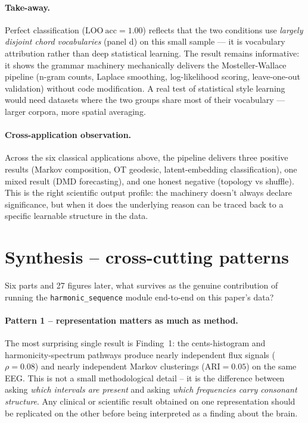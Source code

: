 \documentclass[11pt,a4paper]{article}
\begin{document}
\paragraph{Take-away.}  Perfect classification ($\mathrm{LOO\ acc} =
1.00$) reflects that the two conditions use \emph{largely disjoint
chord vocabularies} (panel d) on this small sample --- it is
vocabulary attribution rather than deep statistical learning. The
result remains informative: it shows the grammar machinery
mechanically delivers the Mosteller-Wallace pipeline (n-gram counts,
Laplace smoothing, log-likelihood scoring, leave-one-out validation)
without code modification. A real test of statistical style learning
would need datasets where the two groups share most of their
vocabulary --- larger corpora, more spatial averaging.

\paragraph{Cross-application observation.}  Across the six classical
applications above, the pipeline delivers three positive results
(Markov composition, OT geodesic, latent-embedding classification),
one mixed result (DMD forecasting), and one honest negative
(topology vs shuffle). This is the right scientific output profile:
the machinery doesn't always declare significance, but when it does
the underlying reason can be traced back to a specific learnable
structure in the data.

\section{Synthesis -- cross-cutting patterns}

Six parts and 27 figures later, what survives as the genuine
contribution of running the \texttt{harmonic\_sequence} module end-to-end
on this paper's data?

\paragraph{Pattern 1 -- representation matters as much as method.}
The most surprising single result is Finding~1: the cents-histogram
and harmonicity-spectrum pathways produce nearly independent flux
signals ($\rho = 0.08$) and nearly independent Markov clusterings
($\mathrm{ARI} = 0.05$) on the same EEG. This is not a small
methodological detail -- it is the difference between asking
\emph{which intervals are present} and asking \emph{which frequencies
carry consonant structure}. Any clinical or scientific result obtained
on one representation should be replicated on the other before being
interpreted as a finding about the brain.
\end{document}
